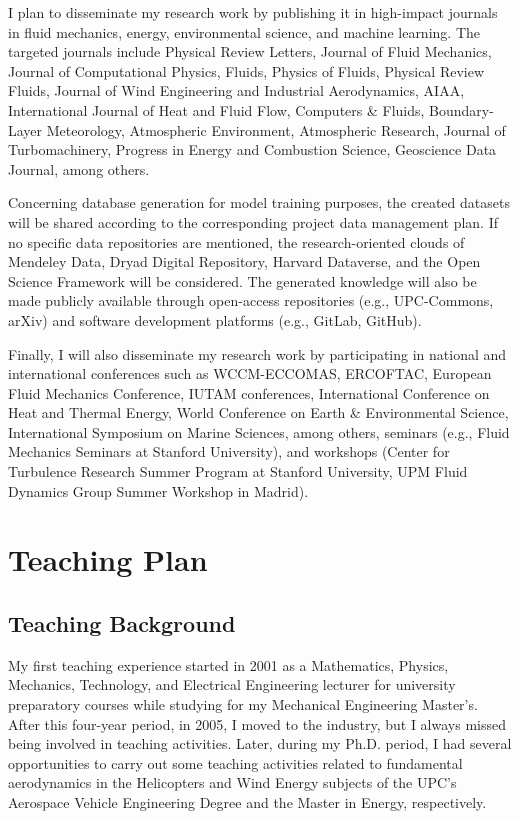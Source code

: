 \documentclass{article}
\begin{document}
I plan to disseminate my research work by publishing it in high-impact journals in fluid mechanics, energy, environmental science, and machine learning. The targeted journals include Physical Review Letters, Journal of Fluid Mechanics, Journal of Computational Physics, Fluids, Physics of Fluids, Physical Review Fluids, Journal of Wind Engineering and Industrial Aerodynamics, AIAA, International Journal of Heat and Fluid Flow, Computers \& Fluids, Boundary-Layer Meteorology, Atmospheric Environment, Atmospheric Research, Journal of Turbomachinery, Progress in Energy and Combustion Science, Geoscience Data Journal, among others.

Concerning database generation for model training purposes, the created datasets will be shared according to the corresponding project data management plan. If no specific data repositories are mentioned, the research-oriented clouds of Mendeley Data, Dryad Digital Repository, Harvard Dataverse, and the Open Science Framework will be considered. The generated knowledge will also be made publicly available through open-access repositories (e.g., UPC-Commons, arXiv) and software development platforms (e.g., GitLab, GitHub).

Finally, I will also disseminate my research work by participating in national and international conferences such as WCCM-ECCOMAS, ERCOFTAC, European Fluid Mechanics Conference, IUTAM conferences, International Conference on Heat and Thermal Energy, World Conference on Earth \& Environmental Science, International Symposium on Marine Sciences, among others, seminars (e.g., Fluid Mechanics Seminars at Stanford University), and workshops (Center for Turbulence Research Summer Program at Stanford University, UPM Fluid Dynamics Group Summer Workshop in Madrid).








\newpage

\section{Teaching Plan} 

\subsection{Teaching Background} \label{sec:teach_back}

My first teaching experience started in 2001 as a Mathematics, Physics, Mechanics, Technology, and Electrical Engineering lecturer for university preparatory courses while studying for my Mechanical Engineering Master's. After this four-year period, in 2005, I moved to the industry, but I always missed being involved in teaching activities. Later, during my Ph.D. period, I had several opportunities to carry out some teaching activities related to fundamental aerodynamics in the Helicopters and Wind Energy subjects of the UPC's Aerospace Vehicle Engineering Degree and the Master in Energy, respectively. 
\end{document}
